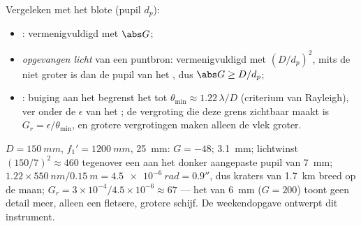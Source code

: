 \begin{proposition}\label{prop:b1:optical-instruments:gains}
Vergeleken met het blote  (pupil $d_p$):
\begin{itemize}
  \item \emph{}: vermenigvuldigd met $\abs G$;
  \item \emph{opgevangen licht} van een puntbron: vermenigvuldigd met
        $(D/d_p)^2$, mits de  niet groter is dan de pupil
        van het , dus $\abs G \geq D/d_p$;
  \item \emph{}: buiging aan het  begrenst
        het tot $\theta_{\min} \approx 1.22\,\lambda/D$ (criterium van
        Rayleigh), ver onder de $\epsilon$ van het ; de vergroting
        die deze grens zichtbaar maakt is $G_r = \epsilon/\theta_{\min}$,
        en grotere vergrotingen maken alleen de vlek groter.
\end{itemize}
\end{proposition}
\admitted

\begin{example}\label{ex:b1:optical-instruments:telnum}
$D = \qty{150}{mm}$, $f_1' = \qty{1200}{mm}$,  \qty{25}{mm}:
$G = -48$;  \qty{3.1}{mm}; lichtwinst $(150/7)^2 \approx
460$ tegenover een aan het donker aangepaste pupil van \qty{7}{mm};
 $1.22 \times
\qty{550}{nm}/\qty{0.15}{m} = \qty{4.5e-6}{rad} = 0.9''$, dus
kraters van \qty{1.7}{km} breed op de maan; $G_r = 3\times10^{-4}/4.5\times
10^{-6} \approx 67$ --- het  van \qty{6}{mm} ($G = 200$) toont geen
detail meer, alleen een fletsere, grotere schijf. De weekendopgave ontwerpt
dit instrument.
\end{example}

